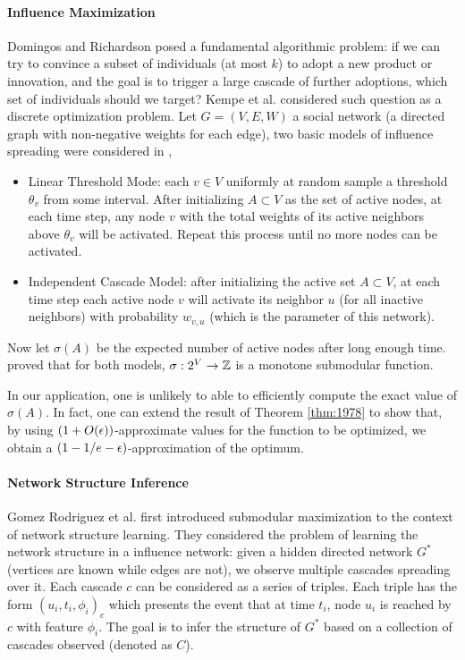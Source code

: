 \paragraph{Influence Maximization}
Domingos and Richardson \cite{DR01,RD02} posed a fundamental algorithmic problem: if we can try to convince a subset of individuals (at most $k$) to adopt a new product or innovation, and the goal is to trigger a large cascade of further adoptions, which set of individuals should we target? 
Kempe et al. \cite{KKT03} considered such question as a discrete optimization problem. Let $G = (V, E, W)$ a social network (a directed graph with non-negative weights for each edge), two basic models of influence spreading were considered in \cite{KKT03},
\begin{itemize}
\item Linear Threshold Mode: each $v\in V$ uniformly at random sample a threshold $\theta_v$ from some interval. After initializing $A \subset V$ as the set of active nodes, at each time step, any node $v$ with the total weights of its active neighbors above $\theta_v$ will be activated. Repeat this process until no more nodes can be activated. 

\item Independent Cascade Model:  after initializing the active set $A \subset V$, at each time step each active node $v$ will activate its neighbor $u$ (for all inactive neighbors) with probability $w_{v,u}$ (which is the parameter of this network).
\end{itemize}

Now let $\sigma(A)$ be the expected number of active nodes after long enough time. \cite{KKT03} proved that for both models, $\sigma: 2^V \rightarrow \mathbb{Z}$ is a monotone submodular function.


In our application, one is unlikely to able to efficiently compute the exact value of $\sigma(A)$. In fact, one can extend the result of Theorem \ref{thm:1978} to show that, by using  $(1 + O(\epsilon))$-approximate values for the function to be optimized, we obtain a $(1 - 1/e - \epsilon)$-approximation of the optimum.


\paragraph{Network Structure Inference}
Gomez Rodriguez et al. \cite{GLK10} first introduced submodular maximization to the context of network structure learning. They considered the problem of learning the network structure in a influence network: given a hidden directed network $G^*$ (vertices are known while edges are not), we observe multiple cascades spreading over it. Each cascade $c$ can be considered as a series of triples. Each triple has the form $(u_i, t_i, \phi_i)_c$ which presents the event that at time $t_i$, node $u_i$ is reached by $c$ with feature $\phi_i$. The goal is to infer the structure of $G^*$ based on a collection of cascades observed (denoted as $C$).

